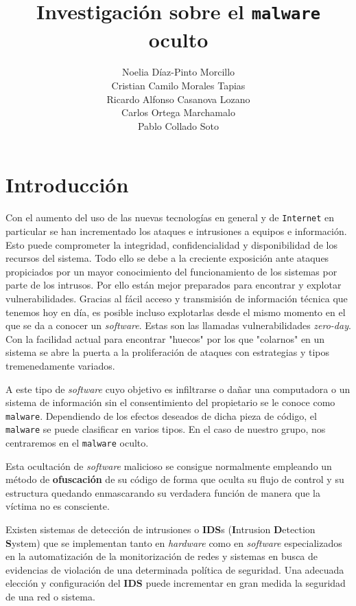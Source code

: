 \documentclass[12pt]{article}
\title{Investigación sobre el \texttt{malware} oculto}
\author{Noelia Díaz-Pinto Morcillo \\ Cristian Camilo Morales Tapias \\ Ricardo Alfonso Casanova Lozano \\ Carlos Ortega Marchamalo \\ Pablo Collado Soto}
\date{}
\newcommand{\newpar} {
    \vskip 0.5cm
}
\begin{document}
    \begin{titlepage}
        \maketitle
    \end{titlepage}

    \newpage
    \tableofcontents
    \newpage

    \section{Introducción}
        Con el aumento del uso de las nuevas tecnologías en general y de \texttt{Internet} en particular se han incrementado los ataques e intrusiones a equipos e información. Esto puede comprometer la integridad, confidencialidad y disponibilidad de los recursos del sistema. Todo ello se debe a la creciente exposición ante ataques propiciados por un mayor conocimiento del funcionamiento de los sistemas por parte de los intrusos. Por ello están mejor preparados para encontrar y explotar vulnerabilidades. Gracias al fácil acceso y transmisión de información técnica que tenemos hoy en día, es posible incluso explotarlas desde el mismo momento en el que se da a conocer un \textit{software}. Estas son las llamadas vulnerabilidades \textit{zero-day}. Con la facilidad actual para encontrar "huecos" por los que "colarnos" en un sistema se abre la puerta a la proliferación de ataques con estrategias y tipos tremenedamente variados.

        \newpar

        A este tipo de \textit{software} cuyo objetivo es infiltrarse o dañar una computadora o un sistema de información sin el consentimiento del propietario se le conoce como 
        \texttt{malware}. Dependiendo de los efectos deseados de dicha pieza de código, el \texttt{malware} se puede clasificar en varios tipos. En el caso de nuestro grupo, nos centraremos en el \texttt{malware} oculto.

        \newpar

        Esta ocultación de \textit{software} malicioso se consigue normalmente empleando un método de \textbf{ofuscación} de su código de forma que oculta su flujo de control y su estructura quedando enmascarando su verdadera función de manera que la víctima no es consciente.

        \newpar

        Existen sistemas de detección de intrusiones o \textbf{IDS}s (\textbf{I}ntrusion \textbf{D}etection \textbf{S}ystem) que se implementan tanto en \textit{hardware} como en \textit{software} especializados en la automatización de la monitorización de redes y sistemas en busca de evidencias de violación de una determinada política de seguridad. Una adecuada elección y configuración del \textbf{IDS} puede incrementar en gran medida la seguridad de una red o sistema.
\end{document}
